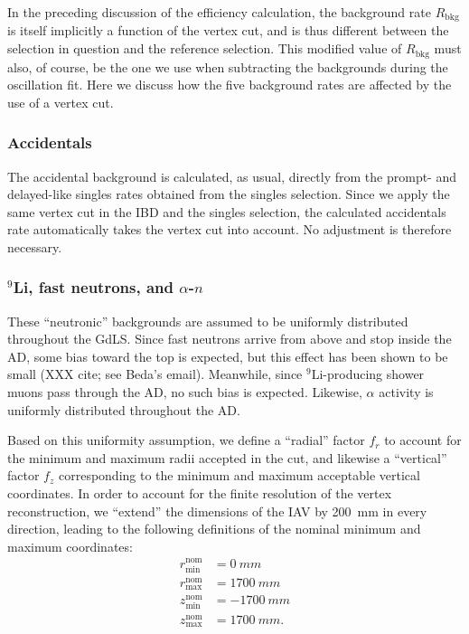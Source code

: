 \documentclass[../thesis.tex]{subfiles}
\begin{document}
In the preceding discussion of the efficiency calculation, the background rate $R_{\mathrm{bkg}}$ is itself implicitly a function of the vertex cut, and is thus different between the selection in question and the reference selection. This modified value of $R_{\mathrm{bkg}}$ must also, of course, be the one we use when subtracting the backgrounds during the oscillation fit. Here we discuss how the five background rates are affected by the use of a vertex cut.

\subsubsection{Accidentals}

The accidental background is calculated, as usual, directly from the prompt- and delayed-like singles rates obtained from the singles selection. Since we apply the same vertex cut in the IBD and the singles selection, the calculated accidentals rate automatically takes the vertex cut into account. No adjustment is therefore necessary.

\subsubsection{$^9$Li, fast neutrons, and $\alpha$-$n$}

These ``neutronic'' backgrounds are assumed to be uniformly distributed throughout the GdLS. Since fast neutrons arrive from above and stop inside the AD, some bias toward the top is expected, but this effect has been shown to be small (XXX cite; see Beda's email). Meanwhile, since $^9$Li-producing shower muons pass through the AD, no such bias is expected. Likewise, $\alpha$ activity is uniformly distributed throughout the AD.

Based on this uniformity assumption, we define a ``radial'' factor $f_r$ to account for the minimum and maximum radii accepted in the cut, and likewise a ``vertical'' factor $f_z$ corresponding to the minimum and maximum acceptable vertical coordinates. In order to account for the finite resolution of the vertex reconstruction, we ``extend'' the dimensions of the IAV by 200~mm in every direction, leading to the following definitions of the nominal minimum and maximum coordinates:
\begin{align*}
  r_{\mathrm{min}}^{\mathrm{nom}} &= \SI{0}{mm}\\
  r_{\mathrm{max}}^{\mathrm{nom}} &= \SI{1700}{mm}\\
  z_{\mathrm{min}}^{\mathrm{nom}} &= \SI{-1700}{mm}\\
  z_{\mathrm{max}}^{\mathrm{nom}} &= \SI{1700}{mm}.
\end{align*}
\end{document}
